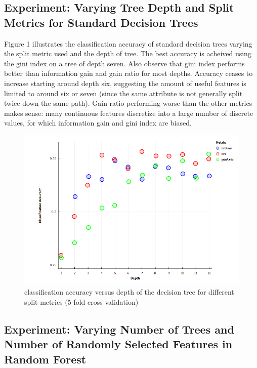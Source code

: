 \documentclass{article} %
\begin{document}
\subsection{Experiment: Varying Tree Depth and Split Metrics for Standard Decision Trees}

Figure 1 illustrates the classification accuracy of standard decision trees varying the split metric used and the depth of tree. The best accuracy is acheived using the gini index on a tree of depth seven. Also observe that  gini index performs better than information gain and gain ratio for most depths. Accuracy ceases to increase starting around depth six, suggesting the amount of useful features is limited to around six or seven (since the same attribute is not generally split twice down the same path). Gain ratio performing worse than the other metrics makes sense: many continuous features discretize into a large number of discrete values, for which information gain and gini index are biased. 

\setlength{\abovecaptionskip}{-20pt}
\begin{figure}
\vspace*{-.5in}
\hspace*{-.9in}
\includegraphics[width=174mm]{decision_trees.png}
\caption{classification accuracy versus depth of the decision tree for different split metrics (5-fold cross validation)}
\end{figure}


\subsection{Experiment: Varying Number of Trees and Number of Randomly Selected Features  in Random Forest}
\end{document}
